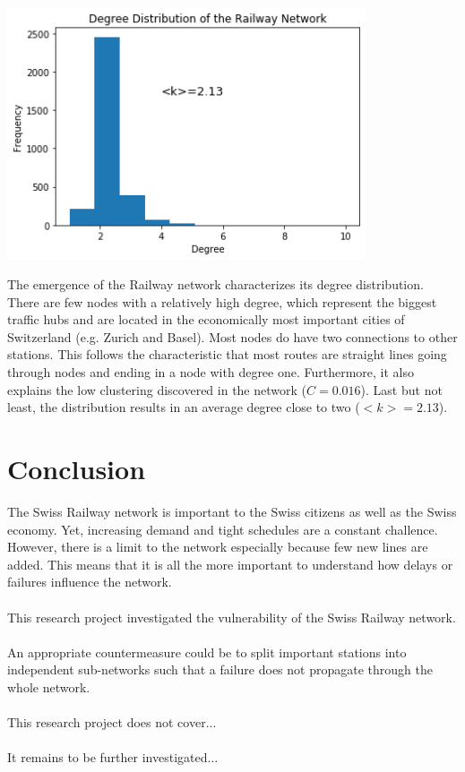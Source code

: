 \documentclass{Resources/netsci-project}
\begin{document}
\begin{center}
    \centering
    \includegraphics[width=300pt]{Resources/degree_distribution}
    \label{fig:degree_distribution}
\end{center}
The emergence of the Railway network characterizes its degree distribution. There are few nodes with a relatively high degree, which represent the biggest traffic hubs and are located in the economically most important cities of Switzerland (e.g. Zurich and Basel). Most nodes do have two connections to other stations. This follows the characteristic that most routes are straight lines going through nodes and ending in a node with degree one. Furthermore, it also explains the low clustering discovered in the network ($ C = 0.016 $). Last but not least, the distribution results in an average degree close to two ($ <k> = 2.13 $). 

\section{Conclusion}
The Swiss Railway network is important to the Swiss citizens as well as the Swiss economy. Yet, increasing demand and tight schedules are a constant challence. However, there is a limit to the network especially because few new lines are added. This means that it is all the more important to understand how delays or failures influence the network.
\\~\\
This research project investigated the vulnerability of the Swiss Railway network. 
\\~\\
An appropriate countermeasure could be to split important stations into independent sub-networks such that a failure does not propagate through the whole network. 
\\~\\
This research project does not cover...
\\~\\
It remains to be further investigated...

\printbibliography
\end{document}

